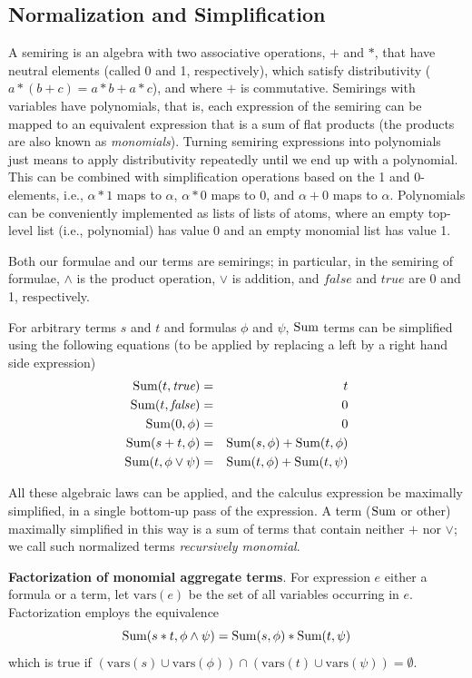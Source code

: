 \subsection{Normalization and Simplification}


A semiring is an algebra with two associative operations,
$+$ and $*$, that
have neutral elements (called 0 and 1, respectively), which satisfy
distributivity ($a*(b+c)= a*b + a*c$), and where $+$ is commutative.
Semirings with variables
have polynomials, that is, each expression of the
semiring can be mapped to an equivalent expression that is
a sum of flat products (the products are also known as {\em monomials}\/).
Turning semiring expressions into polynomials just means to apply
distributivity repeatedly until we end up with a polynomial.
This can be combined with simplification operations based on the 1 and
0-elements, i.e., $\alpha * 1$ maps to $\alpha$, $\alpha*0$ maps to $0$, and
$\alpha+0$ maps to $\alpha$. Polynomials can be conveniently implemented
as lists of lists of atoms, where an empty top-level list (i.e., polynomial)
has value 0 and an empty monomial list has value 1.

Both our formulae and our terms are semirings; in particular,
in the semiring of formulae, $\land$ is the product operation,
$\lor$ is addition,
and $\textit{false}$ and $\textit{true}$ are 0 and 1, respectively.

For arbitrary terms $s$ and $t$ and formulas $\phi$ and $\psi$,
$\mbox{Sum}$ terms can be simplified using the following equations (to be
applied by replacing a left by a right hand side expression)
\begin{eqnarray*}
\mbox{Sum}(t, \textit{true}) &=& t \\
\mbox{Sum}(t, \textit{false}) &=& 0 \\
\mbox{Sum}(0, \phi) &=& 0 \\
\mbox{Sum}(s+t, \phi) &=& \mbox{Sum}(s, \phi) + \mbox{Sum}(t, \phi) \\
\mbox{Sum}(t, \phi \lor \psi) &=& \mbox{Sum}(t, \phi) + \mbox{Sum}(t, \psi)
\end{eqnarray*}

All these algebraic laws can be applied, and the calculus expression
be maximally simplified, in a single bottom-up pass of the expression.
A term ($\mbox{Sum}$ or other) maximally simplified in this way
is a sum of terms that contain neither $+$ nor $\lor$; we call such 
normalized terms {\em recursively monomial}.

\def\vars{\mbox{vars}}

{\bf Factorization of monomial aggregate terms}.
For expression $e$ either a formula or a term, let $\vars(e)$
be the set of all variables occurring in $e$.
Factorization employs the equivalence
\[
\mbox{Sum}(s*t, \phi \land \psi) = \mbox{Sum}(s, \phi) * \mbox{Sum}(t, \psi)
\]
which is true if
$(\vars(s) \cup \vars(\phi)) \cap (\vars(t) \cup \vars(\psi)) = \emptyset$.


